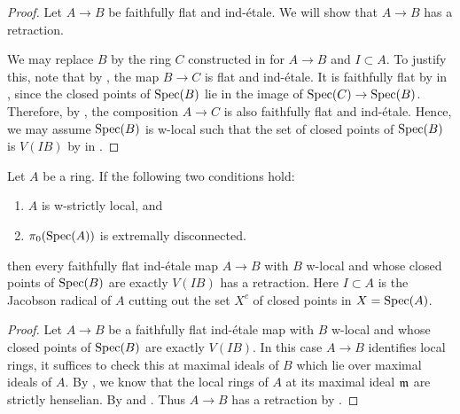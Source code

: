 \begin{proof}
  Let $A \to B$ be faithfully flat and ind-étale. 
  We will show that $A \to B$ has a retraction.

  We may replace $B$ by the ring $C$ constructed in  for $A \to B$ and $I \subset A$. To justify this, note that by , the map \( B \to C \) is flat and ind-étale. It is faithfully flat by  in , since the closed points of \( \operatorname{Spec}(B) \) lie in the image of \( \operatorname{Spec}(C) \to \operatorname{Spec}(B) \). Therefore, by , the composition \( A \to C \) is also faithfully flat and ind-étale. Hence, we may assume $\operatorname{Spec} (B)$ is w-local such that the set of closed points of $\operatorname{Spec} (B)$ is $V(IB)$ by  in .
\end{proof}

\begin{lemma}
  \label{thm:ind-etale-plus-c-has-retraction-if}
  Let $A$ be a ring. If the following two conditions hold:
  \begin{enumerate}
    \item $A$ is w-strictly local, and \label{item:w-strictly-local-ind-etale-plus-c-has-retraction-if}
    \item $\pi_0(\operatorname{Spec} (A))$ is extremally disconnected. \label{item:extremally-disconnected-ind-etale-plus-c-has-retraction-if}
  \end{enumerate}
  then every faithfully flat ind-étale map \(A \to B\) with \(B\) w-local and whose closed points of \(\operatorname{Spec} (B)\) are exactly \(V(IB)\) has a retraction. Here $I \subset A$ is the Jacobson radical of $A$ cutting out the set $X^c$ of closed points in $X = \operatorname{Spec} (A)$.
\end{lemma}

\begin{proof}
  Let \(A \to B\) be a faithfully flat ind-étale map with \(B\) w-local and whose closed points of \(\operatorname{Spec} (B)\) are exactly \(V(IB)\). In this case $A \to B$ identifies local rings, it suffices to check this at maximal ideals of $B$ which lie over maximal ideals of $A$. By , we know that the local rings of $A$ at its maximal ideal ${\mathfrak{m}}$ are strictly henselian. By  and .
  Thus $A \to B$ has a retraction by .
\end{proof}

